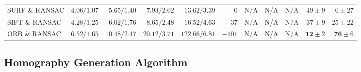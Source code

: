 \begin{table}
\begin{adjustbox}{angle=90, max height=0.85\textheight}
\begin{tabular}{lrrrrrrrrrr}
        SURF \& RANSAC  & $4.06/1.07         $ & $ 5.65/1.40         $ & $ 7.93/2.02         $ & $ 13.62/3.39                  $ & $   0         $ & N/A     & N/A     &  N/A                & $49          \pm 9$ & $   0          \pm 27$ \\
        SIFT \& RANSAC  & $4.28/1.25         $ & $ 6.02/1.76         $ & $ 8.65/2.48         $ & $ 16.52/4.63                  $ & $- 37         $ & N/A     & N/A     &  N/A                & $37          \pm 9$ & $  25          \pm 22$ \\
        ORB \& RANSAC   & $6.52/1.65         $ & $10.48/2.47         $ & $20.12/3.71         $ & $122.66/6.81                  $ & $-101         $ & N/A     & N/A     &  N/A                & $\mathbf{12} \pm 2$ & $  \mathbf{76} \pm  6$ \\ \bottomrule
    \end{tabular}
\end{adjustbox}
\end{table}
\subsection{Homography Generation Algorithm}
\label{c3:sec:hom_opt}


